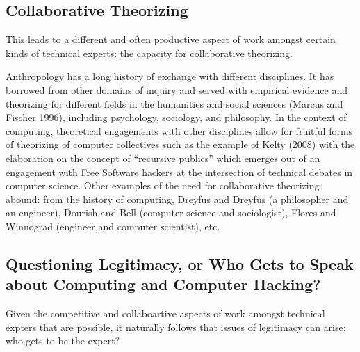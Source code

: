 \documentclass[10pt,letter,oneside]{scrartcl}
\begin{document}
\subsection{Collaborative Theorizing} 

This leads to a different and often productive aspect of work amongst
certain kinds of technical experts: the capacity for collaborative
theorizing.  



Anthropology has a long history of exchange with
different disciplines. It has borrowed from other domains of inquiry
and served with empirical evidence and theorizing for different fields
in the humanities and social sciences (Marcus and Fischer 1996),
including psychology, sociology, and philosophy.  In the context of
computing, theoretical engagements with other disciplines allow for
fruitful forms of theorizing of computer collectives such as the
example of Kelty (2008) with the elaboration on the concept of
``recursive publics'' which emerges out of an engagement with Free
Software hackers at the intersection of technical debates in computer
science. Other examples of the need for collaborative theorizing
abound: from the history of computing, Dreyfus and Dreyfus (a
philosopher and an engineer), Dourish and Bell (computer science and
sociologist), Flores and Winnograd (engineer and computer scientist),
etc.



\subsection{Questioning Legitimacy, or Who Gets to Speak about
    Computing and Computer Hacking?} 

Given the competitive and collaboartive aspects of work amongst
technical expters that are possible, it naturally follows that issues
of legitimacy can arise: who gets to be the expert?
\end{document}
